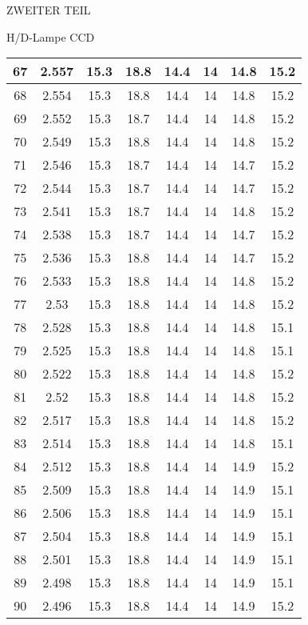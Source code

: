 \begin{appendix}
\begin{chapter}{ZWEITER TEIL}
\begin{section}{H/D-Lampe CCD}
\begin{scriptsize}
\begin{longtable}[htbp]{|c|c|c|c|c|c|c|c|}
            67 & 2.557 & 15.3 & 18.8 & 14.4 & 14 & 14.8 & 15.2 \\ \hline
            68 & 2.554 & 15.3 & 18.8 & 14.4 & 14 & 14.8 & 15.2 \\ \hline
            69 & 2.552 & 15.3 & 18.7 & 14.4 & 14 & 14.8 & 15.2 \\ \hline
            70 & 2.549 & 15.3 & 18.8 & 14.4 & 14 & 14.8 & 15.2 \\ \hline
            71 & 2.546 & 15.3 & 18.7 & 14.4 & 14 & 14.7 & 15.2 \\ \hline
            72 & 2.544 & 15.3 & 18.7 & 14.4 & 14 & 14.7 & 15.2 \\ \hline
            73 & 2.541 & 15.3 & 18.7 & 14.4 & 14 & 14.8 & 15.2 \\ \hline
            74 & 2.538 & 15.3 & 18.7 & 14.4 & 14 & 14.7 & 15.2 \\ \hline
            75 & 2.536 & 15.3 & 18.8 & 14.4 & 14 & 14.7 & 15.2 \\ \hline
            76 & 2.533 & 15.3 & 18.8 & 14.4 & 14 & 14.8 & 15.2 \\ \hline
            77 & 2.53 & 15.3 & 18.8 & 14.4 & 14 & 14.8 & 15.2 \\ \hline
            78 & 2.528 & 15.3 & 18.8 & 14.4 & 14 & 14.8 & 15.1 \\ \hline
            79 & 2.525 & 15.3 & 18.8 & 14.4 & 14 & 14.8 & 15.1 \\ \hline
            80 & 2.522 & 15.3 & 18.8 & 14.4 & 14 & 14.8 & 15.2 \\ \hline
            81 & 2.52 & 15.3 & 18.8 & 14.4 & 14 & 14.8 & 15.2 \\ \hline
            82 & 2.517 & 15.3 & 18.8 & 14.4 & 14 & 14.8 & 15.2 \\ \hline
            83 & 2.514 & 15.3 & 18.8 & 14.4 & 14 & 14.8 & 15.1 \\ \hline
            84 & 2.512 & 15.3 & 18.8 & 14.4 & 14 & 14.9 & 15.2 \\ \hline
            85 & 2.509 & 15.3 & 18.8 & 14.4 & 14 & 14.9 & 15.1 \\ \hline
            86 & 2.506 & 15.3 & 18.8 & 14.4 & 14 & 14.9 & 15.1 \\ \hline
            87 & 2.504 & 15.3 & 18.8 & 14.4 & 14 & 14.9 & 15.1 \\ \hline
            88 & 2.501 & 15.3 & 18.8 & 14.4 & 14 & 14.9 & 15.1 \\ \hline
            89 & 2.498 & 15.3 & 18.8 & 14.4 & 14 & 14.9 & 15.1 \\ \hline
            90 & 2.496 & 15.3 & 18.8 & 14.4 & 14 & 14.9 & 15.2 \\ \hline

\end{longtable}
\end{scriptsize}
\end{section}
\end{chapter}
\end{appendix}
